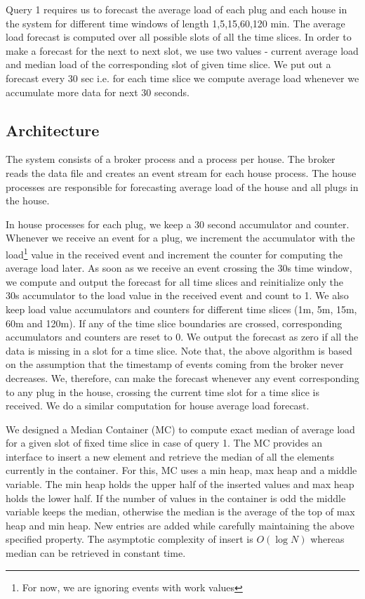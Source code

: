Query 1 requires us to forecast the average load of each plug and each house in the system for different time windows of length 1,5,15,60,120 min. The average load forecast is computed over all possible slots of all the time slices. In order to make a forecast for the next to next slot, we use two values - current average load and median load of the corresponding slot of given time slice. We put out a forecast every 30 sec i.e. for each time slice we compute average load whenever we accumulate more data for next 30 seconds.

\subsection{Architecture}
The system consists of a broker process and a process per house. The broker reads the data file and creates an event stream for each house process. The house processes are responsible for forecasting average load of the house and all plugs in the house.

In house processes for each plug, we keep a 30 second accumulator and counter. Whenever we receive an event for a plug, we increment the accumulator with the load\footnote{For now, we are ignoring events with work values} value in the received event and increment the counter for computing the average load later. As soon as we receive an event crossing the 30s time window, we compute and output the forecast for all time slices and reinitialize only the 30s accumulator to the load value in the received event and count to 1. We also keep load value accumulators and counters for different time slices (1m, 5m, 15m, 60m and 120m). If any of the time slice boundaries are crossed, corresponding accumulators and counters are reset to 0. We output the forecast as zero if all the data is missing in a slot for a time slice. Note that, the above algorithm is based on the assumption that the timestamp of events coming from the broker never decreases. We, therefore, can make the forecast whenever any event corresponding to any plug in the house, crossing the current time slot for a time slice is received. We do a similar computation for house average load forecast.

We designed a Median Container (MC) to compute exact median of average load for a given slot of fixed time slice in case of query 1. The MC provides an interface to insert a new element and retrieve the median of all the elements currently in the container. For this, MC uses a min heap, max heap and a middle variable. The min heap holds the upper half of the inserted values and max heap holds the lower half. If the number of values in the container is odd the middle variable keeps the median, otherwise the median is the average of the top of max heap and min heap. New entries are added while carefully maintaining the above specified property. The asymptotic complexity of insert is $O(\log N)$ whereas median can be retrieved in constant time.

